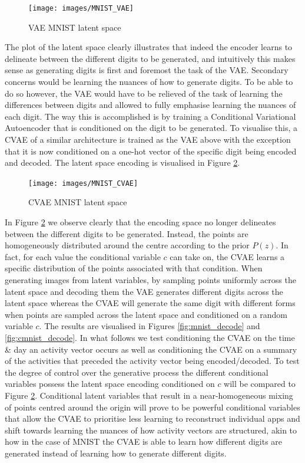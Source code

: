 \begin{figure}[htbp]
    \centering
    \texttt{[image: images/MNIST\_VAE]}
    \caption{VAE MNIST latent space}
    \label{fig:mnist_vae}
\end{figure}

The plot of the latent space clearly illustrates that indeed the encoder learns to delineate between the different digits to be generated, and intuitively this makes sense as generating digits is first and foremost the task of the VAE. Secondary concerns would be learning the nuances of how to generate digits. To be able to do so however, the VAE would have to be relieved of the task of learning the differences between digits and allowed to fully emphasise learning the nuances of each digit. The way this is accomplished is by training a Conditional Variational Autoencoder that is conditioned on the digit to be generated. To visualise this, a CVAE of a similar architecture is trained as the VAE above with the exception that it is now conditioned on a one-hot vector of the specific digit being encoded and decoded. The latent space encoding is visualised in Figure \ref{fig:mnist_cvae}. \\

\begin{figure}[htbp]
    \centering
    \texttt{[image: images/MNIST\_CVAE]}
    \caption{CVAE MNIST latent space}
    \label{fig:mnist_cvae}
\end{figure}

In Figure \ref{fig:mnist_cvae} we observe clearly that the encoding space no longer delineates between the different digits to be generated. Instead, the points are homogeneously distributed around the centre according to the prior $P(z)$. In fact, for each value the conditional variable $c$ can take on, the CVAE learns a specific distribution of the points associated with that condition. When generating images from latent variables, by sampling points uniformly across the latent space and decoding them the VAE generates different digits across the latent space whereas the CVAE will generate the same digit with different forms when points are sampled across the latent space and conditioned on a random variable $c$. The results are visualised in Figures \ref{fig:mnist_decode} and \ref{fig:cmnist_decode}. In what follows we test conditioning the CVAE on the time \& day an activity vector occurs as well as conditioning the CVAE on a summary of the activities that preceded the activity vector being encoded/decoded. To test the degree of control over the generative process the different conditional variables possess the latent space encoding conditioned on $c$ will be compared to Figure \ref{fig:mnist_cvae}. Conditional latent variables that result in a near-homogeneous mixing of points centred around the origin will prove to be powerful conditional variables that allow the CVAE to prioritise less learning to reconstruct individual apps and shift towards learning the nuances of how activity vectors are structured, akin to how in the case of MNIST the CVAE is able to learn how different digits are generated instead of learning how to generate different digits. 


